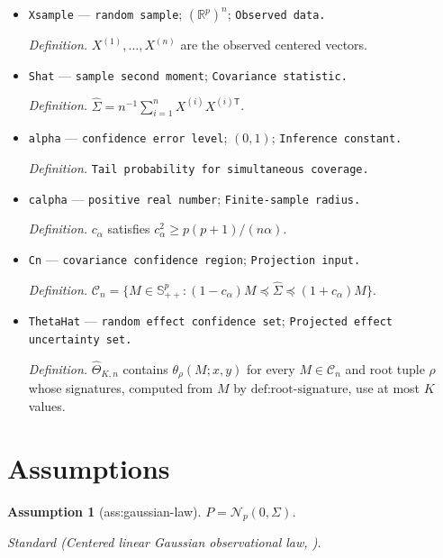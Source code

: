 \documentclass{article}
\newtheorem{assumption}{Assumption}
\begin{document}
\begin{itemize}
  \par\smallskip\noindent\emph{Definition.} \texttt{Gaussian sample size.}
  \item \texttt{Xsample} --- \texttt{random sample}; \((\mathbb R^p)^n\); \texttt{Observed data.}
  \par\smallskip\noindent\emph{Definition.} \(X^{(1)},\ldots,X^{(n)}\) are the observed centered vectors.
  \item \texttt{Shat} --- \texttt{sample second moment}; \texttt{Covariance statistic.}
  \par\smallskip\noindent\emph{Definition.} \(\widehat\Sigma=n^{-1}\sum_{i=1}^{n}X^{(i)}X^{(i)\mathsf T}\).
  \item \texttt{alpha} --- \texttt{confidence error level}; \((0,1)\); \texttt{Inference constant.}
  \par\smallskip\noindent\emph{Definition.} \texttt{Tail probability for simultaneous coverage.}
  \item \texttt{calpha} --- \texttt{positive real number}; \texttt{Finite-\allowbreak{}sample radius.}
  \par\smallskip\noindent\emph{Definition.} \(c_\alpha\) satisfies \(c_\alpha^2\ge p(p+1)/(n\alpha)\).
  \item \texttt{Cn} --- \texttt{covariance confidence region}; \texttt{Projection input.}
  \par\smallskip\noindent\emph{Definition.} \(\mathcal C_n=\{M\in\mathbb S_{++}^{p}:(1-c_\alpha)M\preceq\widehat\Sigma\preceq(1+c_\alpha)M\}\).
  \item \texttt{ThetaHat} --- \texttt{random effect confidence set}; \texttt{Projected effect uncertainty set.}
  \par\smallskip\noindent\emph{Definition.} \(\widehat\Theta_{K,n}\) contains \(\theta_\rho(M;x,y)\) for every \(M\in\mathcal C_n\) and root tuple \(\rho\) whose signatures, computed from \(M\) by \(\text{def:root-signature}\), use at most \(K\) values.
\end{itemize}

\section{Assumptions}

\begin{assumption}[ass:gaussian-law]\label{ass:gaussian-law}
\(P=\mathcal N_p(0,\Sigma)\).
\par\smallskip\noindent\emph{Standard} (Centered linear Gaussian observational law, \cite{PetersBuhlmann2014}).
\end{assumption}
\end{document}
